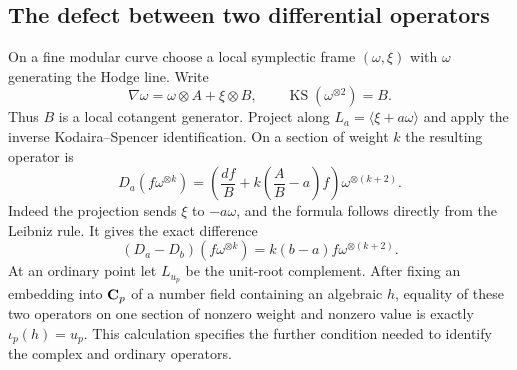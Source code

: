 \documentclass[11pt]{article}
\theoremstyle{definition}\newtheorem{definition}[theorem]{Definition}
\theoremstyle{remark}\newtheorem{remark}[theorem]{Remark}
\begin{document}
\subsection{The defect between two differential operators}
On a fine modular curve choose a local symplectic frame $(\omega,\xi)$ with $\omega$ generating the Hodge line. Write
\[
 \nabla\omega=\omega\otimes A+\xi\otimes B,\qquad
           \operatorname{KS}(\omega^{\otimes2})=B.
\]
Thus $B$ is a local cotangent generator. Project along $L_a=\langle\xi+a\omega\rangle$ and apply the inverse Kodaira--Spencer identification. On a section of weight $k$ the resulting operator is
\[
 D_a(f\omega^{\otimes k})=
 \left(\frac{df}{B}+k\left(\frac AB-a\right)f\right)\omega^{\otimes(k+2)}.
\]
Indeed the projection sends $\xi$ to $-a\omega$, and the formula follows directly from the Leibniz rule. It gives the exact difference
\[
       (D_a-D_b)(f\omega^{\otimes k})
                     =k(b-a)f\omega^{\otimes(k+2)}.
\]
At an ordinary point let $L_{u_p}$ be the unit-root complement. After fixing an embedding into $\mathbf C_p$ of a number field containing an algebraic $h$, equality of these two operators on one section of nonzero weight and nonzero value is exactly $\iota_p(h)=u_p$. This calculation specifies the further condition needed to identify the complex and ordinary operators.
\end{document}
